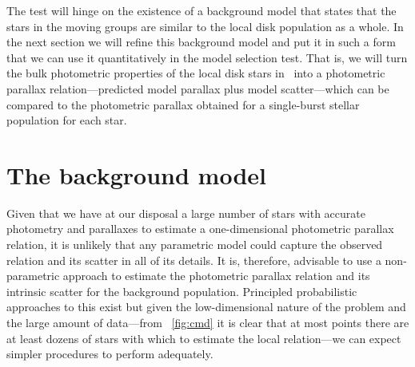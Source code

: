 The test will hinge on the existence of a background model that states
that the stars in the moving groups are similar to the local disk
population as a whole. In the next section we will refine this
background model and put it in such a form that we can use it
quantitatively in the model selection test. That is, we will turn the
bulk photometric properties of the local disk stars in \Hipparcos\
into a photometric parallax relation---predicted model parallax plus
model scatter---which can be compared to the photometric parallax
obtained for a single-burst stellar population for each star.


\section{The background model}\label{sec:background}

Given that we have at our disposal a large number of stars with
accurate photometry and parallaxes to estimate a one-dimensional
photometric parallax relation, it is unlikely that any parametric
model could capture the observed relation and its scatter in all of
its details. It is, therefore, advisable to use a non-parametric
approach to estimate the photometric parallax relation and its
intrinsic scatter for the background population. Principled
probabilistic approaches to this exist \citep[\eg, using Gaussian
Process regression:][]{rasmussen2005a} but given the low-dimensional
nature of the problem and the large amount of data---from
\figurename~\ref{fig:cmd} it is clear that at most points there are at
least dozens of stars with which to estimate the local relation---we
can expect simpler procedures to perform adequately.

